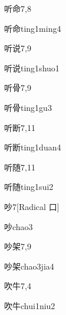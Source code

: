 \begin{entry}{听命}{7,8}
  \begin{phonetics}{听命}{ting1ming4}
  \end{phonetics}
\end{entry}

\begin{entry}{听说}{7,9}
  \begin{phonetics}{听说}{ting1shuo1}
  \end{phonetics}
\end{entry}

\begin{entry}{听骨}{7,9}
  \begin{phonetics}{听骨}{ting1gu3}
  \end{phonetics}
\end{entry}

\begin{entry}{听断}{7,11}
  \begin{phonetics}{听断}{ting1duan4}
  \end{phonetics}
\end{entry}

\begin{entry}{听随}{7,11}
  \begin{phonetics}{听随}{ting1sui2}
  \end{phonetics}
\end{entry}

\begin{entry}{吵}{7}[Radical ⼝]
  \begin{phonetics}{吵}{chao3}
  \end{phonetics}
\end{entry}

\begin{entry}{吵架}{7,9}
  \begin{phonetics}{吵架}{chao3jia4}
  \end{phonetics}
\end{entry}

\begin{entry}{吹牛}{7,4}
  \begin{phonetics}{吹牛}{chui1niu2}
  \end{phonetics}
\end{entry}

